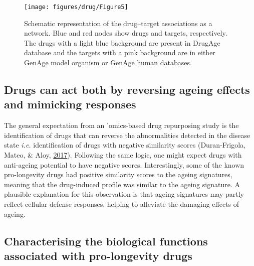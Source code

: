 \documentclass[12pt,twoside]{unicam}
\begin{document}
\begin{figure}

{\centering \texttt{[image: figures/drug/Figure5]} 

}

\caption[Drug-target network.]{Schematic representation of the drug–target associations as a network. Blue and red nodes show drugs and targets, respectively. The drugs with a light blue background are present in DrugAge database and the targets with a pink background are in either GenAge model organism or GenAge human databases.}\label{fig:drugFig5}
\end{figure}

\hypertarget{drugs-can-act-both-by-reversing-ageing-effects-and-mimicking-responses}{%
\subsection{Drugs can act both by reversing ageing effects and mimicking responses}\label{drugs-can-act-both-by-reversing-ageing-effects-and-mimicking-responses}}

The general expectation from an 'omics-based drug repurposing study is the identification of drugs that can reverse the abnormalities detected in the disease state \emph{i.e.} identification of drugs with negative similarity scores (Duran-Frigola, Mateo, \& Aloy, \protect\hyperlink{ref-Duran-Frigola2017}{2017}). Following the same logic, one might expect drugs with anti-ageing potential to have negative scores. Interestingly, some of the known pro-longevity drugs had positive similarity scores to the ageing signatures, meaning that the drug-induced profile was similar to the ageing signature. A plausible explanation for this observation is that ageing signatures may partly reflect cellular defense responses, helping to alleviate the damaging effects of ageing.

\hypertarget{characterising-the-biological-functions-associated-with-pro-longevity-drugs}{%
\subsection{Characterising the biological functions associated with pro-longevity drugs}\label{characterising-the-biological-functions-associated-with-pro-longevity-drugs}}
\end{document}
